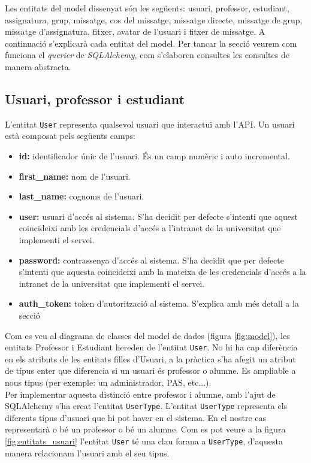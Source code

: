 Les entitats del model dissenyat són les següents: usuari, professor, estudiant, assignatura, grup, missatge, cos del missatge, missatge directe, missatge de grup, missatge d'assignatura, fitxer, avatar de l'usuari i fitxer de missatge. A continuació s'explicarà cada entitat del model. Per tancar la secció veurem com funciona el \emph{querier} de \emph{SQLAlchemy}, com s'elaboren consultes les consultes de manera abstracta.

	\subsection{Usuari, professor i estudiant} \label{usuari_professor_estudiant}

	L'entitat \texttt{User} representa qualsevol usuari que interactuï amb l'\ac{API}. Un usuari està composat pels següents camps: 
	\begin{itemize}
		\item \textbf{id:} identificador únic de l'usuari. És un camp numèric i auto incremental.
		\item \textbf{first\_name:} nom de l'usuari.
		\item \textbf{last\_name:} cognoms de l'usuari.
		\item \textbf{user:} usuari d'accés al sistema. S'ha decidit per defecte s'intenti que aquest coincideixi amb les credencials d'accés a l'intranet de la universitat que implementi el servei.
		\item \textbf{password:} contrassenya d'accés al sistema. S'ha decidit que per defecte s'intenti que aquesta coincideixi amb la mateixa de les credencials d'accés a la intranet de la universitat que implementi el servei. 
		\item \textbf{auth\_token:} token d'autorització al sistema. S'explica amb més detall a la secció %
	\end{itemize}
	
	Com es veu al diagrama de classes del model de dades (figura \ref{fig:model}), les entitats Professor i Estudiant hereden de l'entitat \texttt{User}. No hi ha cap diferència en els atributs de les entitats filles d'Usuari, a la pràctica s'ha afegit un atribut de típus enter que diferencia si un usuari és professor o alumne. Es ampliable a nous tipus (per exemple: un administrador, \ac{PAS}, etc...). \\
	
	Per implementar aquesta distinció entre professor i alumne, amb l'ajut de SQLAlchemy s'ha creat l'entitat \texttt{UserType}. L'entitat \texttt{UserType} representa els diferents típus d'usuari que hi pot haver en el sistema. En el nostre cas representarà o bé un professor o bé un alumne. Com es pot veure a la figura \ref{fig:entitats_usuari} l'entitat \texttt{User} té una clau forana a \texttt{UserType}, d'aquesta manera relacionam l'usuari amb el seu tipus. \\
	
